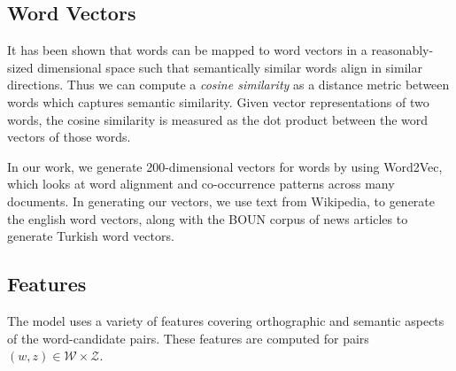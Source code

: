 \documentclass[11pt,twocolumn]{article}
\begin{document}
\subsection{Word Vectors}

It has been shown that words can be mapped to word vectors in a reasonably-sized dimensional space such that semantically similar words align in similar directions. Thus we can compute a \emph{cosine similarity} as a distance metric between words which captures semantic similarity. Given vector representations of two words, the cosine similarity is measured as the dot product between the word vectors of those words.

In our work, we generate 200-dimensional vectors for words by using Word2Vec, which looks at word alignment  and co-occurrence patterns across many documents. In generating our vectors, we use text from Wikipedia,
to generate the english word vectors, along with the BOUN corpus of news articles to generate Turkish word vectors.

\subsection{Features}

The model uses a variety of features covering orthographic and semantic aspects of the word-candidate pairs. These features are computed for pairs $(w,z) \in \mathcal W \times \mathcal Z$.
\end{document}
